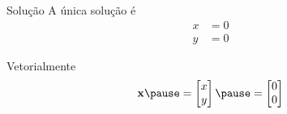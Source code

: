 \begin{resolution}{Solução}
  A única solução é
  \begin{align*}
    x & = 0 \\
    y & = 0
  \end{align*}

  \pause
  Vetorialmente
  \[
    \mathbf{x}
    \pause
    =
    \begin{bmatrix}
      x \\
      y
    \end{bmatrix}
    \pause
    =
    \begin{bmatrix}
      0 \\
      0
    \end{bmatrix}
  \]
\end{resolution}

\endinput
